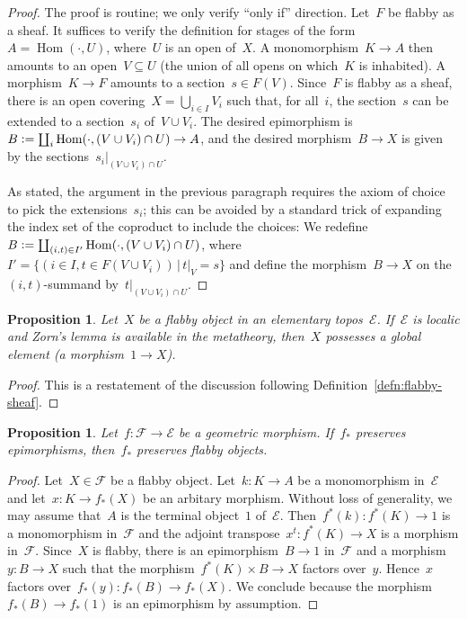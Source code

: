 \documentclass[oneside]{amsart}
\theoremstyle{definition}
\theoremstyle{plain}
\newtheorem{prop}[defn]{Proposition}
\theoremstyle{remark}
\newcommand{\E}{\mathcal{E}}
\newcommand{\F}{\mathcal{F}}
\newcommand{\defeq}{\vcentcolon=}
\DeclareMathOperator{\Hom}{Hom}
\renewcommand{\_}{\mathpunct{.}\,}
\begin{document}
\begin{proof}The proof is routine; we only verify ``only if'' direction.
Let~$F$ be flabby as a sheaf. It suffices to verify the definition for stages
of the form~$A = \Hom(\cdot,U)$, where~$U$ is an open of~$X$. A monomorphism~$K
\to A$ then amounts to an open~$V \subseteq U$ (the union of all opens on
which~$K$ is inhabited). A morphism~$K \to F$ amounts to a section~$s \in
F(V)$. Since~$F$ is flabby as a sheaf, there is an open covering~$X =
\bigcup_{i \in I} V_i$ such that, for all~$i$, the section~$s$ can be extended
to a section~$s_i$ of~$V \cup V_i$. The desired epimorphism is~$B \defeq
\coprod_i \Hom(\cdot,(V \cup V_i) \cap U) \to A$, and the desired morphism~$B
\to X$ is given by the sections~$s_i|_{(V \cup V_i) \cap U}$.

As stated, the argument in the previous paragraph requires the axiom of choice
to pick the extensions~$s_i$; this can be avoided by a standard trick of
expanding the index set of the coproduct to include the choices: We redefine $B \defeq
\coprod_{(i,t) \in I'} \Hom(\cdot, (V \cup V_i) \cap U)$, where~$I' = \{ (i \in
I, t \in F(V \cup V_i)) \,|\, t|_V = s \}$ and define the morphism~$B \to X$ on
the~$(i,t)$-summand by~$t|_{(V \cup V_i) \cap U}$.
\end{proof}

\begin{prop}\label{prop:global-elements}
Let~$X$ be a flabby object in an elementary topos~$\E$. If~$\E$ is localic and
Zorn's lemma is available in the metatheory, then~$X$ possesses a global element (a morphism~$1 \to X$).
\end{prop}

\begin{proof}This is a restatement of the discussion following
Definition~\ref{defn:flabby-sheaf}.
\end{proof}

\begin{prop}\label{prop:pushforward-of-flabby-objects}
Let~$f : \F \to \E$ be a geometric morphism. If~$f_*$ preserves epimorphisms,
then~$f_*$ preserves flabby objects.\end{prop}

\begin{proof}Let~$X \in \F$ be a flabby object.
Let~$k : K \to A$ be a monomorphism in~$\E$ and let~$x : K \to f_*(X)$ be an
arbitary morphism. Without loss of generality, we may assume that~$A$ is the
terminal object~$1$ of~$\E$. Then~$f^*(k) : f^*(K) \to 1$ is a monomorphism
in~$\F$ and the adjoint transpose~$x^t : f^*(K) \to X$
is a morphism in~$\F$. Since~$X$ is flabby, there is an epimorphism~$B \to 1$
in~$\F$ and a morphism~$y : B \to X$ such that the morphism~$f^*(K) \times B
\to X$ factors over~$y$. Hence~$x$ factors over~$f_*(y) : f_*(B) \to f_*(X)$.
We conclude because the morphism~$f_*(B) \to f_*(1)$ is an epimorphism by
assumption.
\end{proof}
\end{document}
